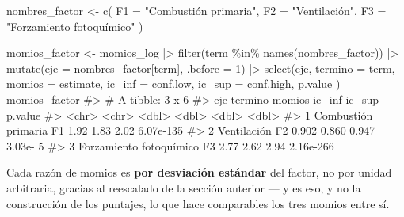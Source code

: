 \documentclass[
  spanish,
  letterpaper,
  DIV=11,
  numbers=noendperiod]{scrartcl}
\newenvironment{Shaded}{\begin{snugshade}}{\end{snugshade}}
\newcommand{\AttributeTok}[1]{\textcolor[rgb]{0.40,0.45,0.13}{#1}}
\newcommand{\CommentTok}[1]{\textcolor[rgb]{0.37,0.37,0.37}{#1}}
\newcommand{\DecValTok}[1]{\textcolor[rgb]{0.68,0.00,0.00}{#1}}
\newcommand{\FunctionTok}[1]{\textcolor[rgb]{0.28,0.35,0.67}{#1}}
\newcommand{\NormalTok}[1]{\textcolor[rgb]{0.00,0.23,0.31}{#1}}
\newcommand{\OtherTok}[1]{\textcolor[rgb]{0.00,0.23,0.31}{#1}}
\newcommand{\SpecialCharTok}[1]{\textcolor[rgb]{0.37,0.37,0.37}{#1}}
\newcommand{\StringTok}[1]{\textcolor[rgb]{0.13,0.47,0.30}{#1}}
\begin{document}
\begin{Shaded}
\begin{Highlighting}[]
\NormalTok{nombres\_factor }\OtherTok{\textless{}{-}} \FunctionTok{c}\NormalTok{(}
    \AttributeTok{F1 =} \StringTok{"Combustión primaria"}\NormalTok{,}
    \AttributeTok{F2 =} \StringTok{"Ventilación"}\NormalTok{,}
    \AttributeTok{F3 =} \StringTok{"Forzamiento fotoquímico"}
\NormalTok{)}

\NormalTok{momios\_factor }\OtherTok{\textless{}{-}}\NormalTok{ momios\_log }\SpecialCharTok{|\textgreater{}}
    \FunctionTok{filter}\NormalTok{(term }\SpecialCharTok{\%in\%} \FunctionTok{names}\NormalTok{(nombres\_factor)) }\SpecialCharTok{|\textgreater{}}
    \FunctionTok{mutate}\NormalTok{(}\AttributeTok{eje =}\NormalTok{ nombres\_factor[term], }\AttributeTok{.before =} \DecValTok{1}\NormalTok{) }\SpecialCharTok{|\textgreater{}}
    \FunctionTok{select}\NormalTok{(eje,}
        \AttributeTok{termino =}\NormalTok{ term, }\AttributeTok{momios =}\NormalTok{ estimate,}
        \AttributeTok{ic\_inf =}\NormalTok{ conf.low, }\AttributeTok{ic\_sup =}\NormalTok{ conf.high, p.value}
\NormalTok{    )}
\NormalTok{momios\_factor}
\CommentTok{\#\textgreater{} \# A tibble: 3 x 6}
\CommentTok{\#\textgreater{}   eje                     termino momios ic\_inf ic\_sup   p.value}
\CommentTok{\#\textgreater{}   \textless{}chr\textgreater{}                   \textless{}chr\textgreater{}    \textless{}dbl\textgreater{}  \textless{}dbl\textgreater{}  \textless{}dbl\textgreater{}     \textless{}dbl\textgreater{}}
\CommentTok{\#\textgreater{} 1 Combustión primaria     F1       1.92   1.83   2.02  6.07e{-}135}
\CommentTok{\#\textgreater{} 2 Ventilación             F2       0.902  0.860  0.947 3.03e{-}  5}
\CommentTok{\#\textgreater{} 3 Forzamiento fotoquímico F3       2.77   2.62   2.94  2.16e{-}266}
\end{Highlighting}
\end{Shaded}

Cada razón de momios es \textbf{por desviación estándar} del factor, no
por unidad arbitraria, gracias al reescalado de la sección anterior ---
y es eso, y no la construcción de los puntajes, lo que hace comparables
los tres momios entre sí.
\end{document}
